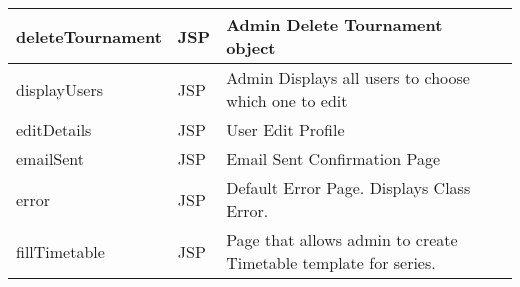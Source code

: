 \begin{table}[H]
\begin{center}
\begin{tabular}{| l | l | l| p{1cm} |}
	deleteTournament & JSP & Admin Delete Tournament object\\ \hline	
	displayUsers & JSP & Admin Displays all users to choose which one to edit\\ \hline	
	editDetails & JSP & User Edit Profile\\ \hline	
	emailSent & JSP & Email Sent Confirmation Page\\ \hline	
	error & JSP & Default Error Page. Displays Class Error. \\ \hline	
	fillTimetable & JSP & Page that allows admin to create Timetable template for series.\\ \hline	
    \end{tabular}
\end{center}
\end{table}
\pagebreak

